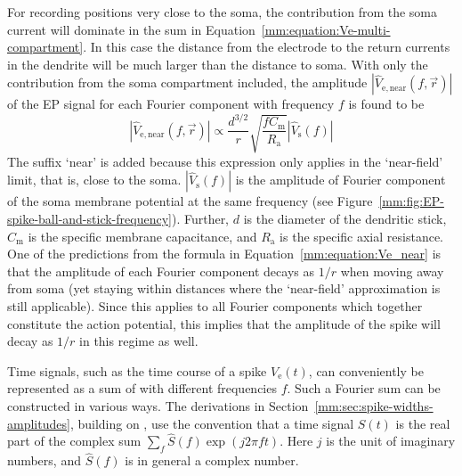 For recording positions very close to the soma, the contribution from the soma current will dominate 
in the sum in Equation~\ref{mm:equation:Ve-multi-compartment}. In this case the distance from the electrode
to the return currents in the dendrite will be much larger than the distance to soma. With only the contribution from
the soma compartment included, the amplitude $|\hat{V}_\mathrm{e,near}(f,\vec{r})|$  
of the EP signal for each Fourier component with frequency $f$ is found to be
%
\begin{equation}
  |\hat{V}_\mathrm{e,near}(f,\vec{r})| 
  \propto \frac{d^{3/2}}{r} \sqrt{ \frac{f C_\mathrm{m}}{R_\mathrm{a}} }  |\hat{V}_\mathrm{s}(f)| 
  \label{mm:equation:Ve_near}
\end{equation}
%
The suffix `near' is added because this expression only applies in the `near-field' limit, that is,
close to the soma.
$|\hat{V}_\mathrm{s}(f)|$ is the amplitude of Fourier component of the soma membrane potential at the same
frequency (see Figure~\ref{mm:fig:EP-spike-ball-and-stick-frequency}). Further, $d$ is the diameter of the dendritic
stick, $C_\mathrm{m}$ is the specific membrane capacitance, and $R_\mathrm{a}$ is the specific axial resistance.  
One of the predictions from the formula in Equation~\ref{mm:equation:Ve_near} is that the amplitude of each Fourier component decays
as $1/r$ when moving away from soma (yet staying within distances where the `near-field' approximation is still applicable).
Since this applies to all Fourier components which together constitute the action potential, this implies that the amplitude of the 
spike will decay as $1/r$ in this regime as well.

\begin{sidebox}
Time signals, such as the time course of a spike $V_\mathrm{e}(t)$,  can conveniently 
be represented as a sum of  with different frequencies $f$. 
Such a Fourier sum can be constructed in
various ways. The derivations in 
Section~\ref{mm:sec:spike-widths-amplitudes}, building on \citet{Pettersen2008}, use the  
convention that a time signal $S(t)$ is the real part of the complex sum $\sum_{f}  \hat{S}(f) \exp (j 2 \pi f t)$. 
Here $j$ is the unit of imaginary numbers, and  $\hat{S}(f)$ is in general a complex number. 
\end{sidebox}
%

